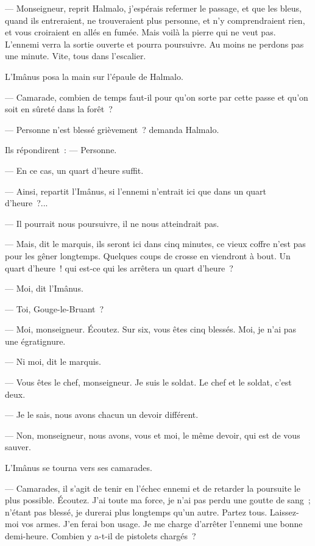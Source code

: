 \documentclass[french,twoside]{book} %
\begin{document}
— Monseigneur, reprit Halmalo, j’espérais refermer le passage, et que les bleus, quand ils entreraient, ne trouveraient plus personne, et n’y comprendraient rien, et vous croiraient en allés en fumée. Mais voilà la pierre qui ne veut pas. L’ennemi verra la sortie ouverte et pourra poursuivre. Au moins ne perdons pas une minute. Vite, tous dans l’escalier.\par
L’Imânus posa la main sur l’épaule de Halmalo.\par
— Camarade, combien de temps faut-il pour qu’on sorte par cette passe et qu’on soit en sûreté dans la forêt ?\par
— Personne n’est blessé grièvement ? demanda Halmalo.\par
 Ils répondirent : — Personne.\par
— En ce cas, un quart d’heure suffit.\par
— Ainsi, repartit l’Imânus, si l’ennemi n’entrait ici que dans un quart d’heure ?...\par
— Il pourrait nous poursuivre, il ne nous atteindrait pas.\par
— Mais, dit le marquis, ils seront ici dans cinq minutes, ce vieux coffre n’est pas pour les gêner longtemps. Quelques coups de crosse en viendront à bout. Un quart d’heure ! qui est-ce qui les arrêtera un quart d’heure ?\par
— Moi, dit l’Imânus.\par
— Toi, Gouge-le-Bruant ?\par
— Moi, monseigneur. Écoutez. Sur six, vous êtes cinq blessés. Moi, je n’ai pas une égratignure.\par
— Ni moi, dit le marquis.\par
— Vous êtes le chef, monseigneur. Je suis le soldat. Le chef et le soldat, c’est deux.\par
— Je le sais, nous avons chacun un devoir différent.\par
— Non, monseigneur, nous avons, vous et moi, le même devoir, qui est de vous sauver.\par
L’Imânus se tourna vers ses camarades.\par
— Camarades, il s’agit de tenir en l’échec ennemi et de retarder la poursuite le plus possible. Écoutez. J’ai toute ma force, je n’ai pas perdu une goutte de sang ; n’étant pas blessé, je durerai plus longtemps qu’un autre. Partez tous. Laissez-moi vos armes. J’en ferai bon usage. Je me charge d’arrêter l’ennemi une bonne demi-heure. Combien y a-t-il de pistolets chargés ?\par
\end{document}
